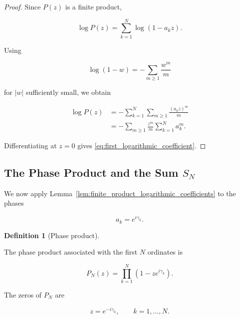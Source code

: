 \documentclass[11pt]{amsart}
\numberwithin{equation}{section}
\theoremstyle{plain}
\theoremstyle{definition}
\newtheorem{definition}[theorem]{Definition}
\theoremstyle{remark}
\begin{document}
\begin{proof}

Since \(P(z)\) is a finite product,

\begin{equation}
\log P(z)
=
\sum_{k=1}^{N}
\log(1-a_k z).
\label{eq:finite_product_logarithm_sum}
\end{equation}

Using

\begin{equation}
\log(1-w)
=
-
\sum_{m\ge 1}
\frac{w^m}{m}
\label{eq:log_one_minus_w_expansion}
\end{equation}

for \(|w|\) sufficiently small, we obtain

\begin{align}
\log P(z)
&=
-
\sum_{k=1}^{N}
\sum_{m\ge 1}
\frac{(a_k z)^m}{m}
\label{eq:finite_product_expansion_first}
\\
&=
-
\sum_{m\ge 1}
\frac{z^m}{m}
\sum_{k=1}^{N}
a_k^m.
\label{eq:finite_product_expansion_second}
\end{align}

Differentiating at \(z=0\) gives
\eqref{eq:first_logarithmic_coefficient}.

\end{proof}
\subsection{The Phase Product and the Sum \(S_N\)}
\label{subsec:phase_product_SN}

We now apply Lemma~\ref{lem:finite_product_logarithmic_coefficients}
to the phases

\begin{equation}
a_k
=
e^{i\gamma_k}.
\label{eq:phase_product_ak}
\end{equation}

\begin{definition}[Phase product]
\label{def:phase_product}

The phase product associated with the first \(N\) ordinates is

\begin{equation}
P_N(z)
=
\prod_{k=1}^{N}
\left(1-z e^{i\gamma_k}\right).
\label{eq:phase_product_definition}
\end{equation}

\end{definition}

The zeros of \(P_N\) are

\begin{equation}
z
=
e^{-i\gamma_k},
\qquad
k=1,\ldots,N.
\label{eq:phase_product_zeros}
\end{equation}
\end{document}
